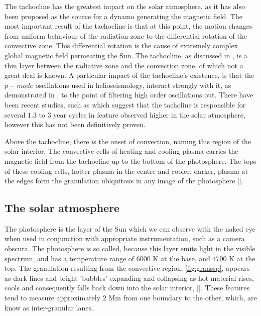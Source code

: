 The tachocline has the greatest impact on the solar atmosphere, as it has also been proposed as the source for a dynamo generating the magnetic field.
The most important result of the tachocline is that at this point, the motion changes from uniform behaviour of the radiation zone to the differential rotation of the convective zone.
This differential rotation is the cause of extremely complex global magnetic field permeating the Sun.
The tachocline, as discussed in \cite{Brun2001}, is a thin layer between the radiative zone and the convection zone, of which not a great deal is known.
A particular impact of the tachocline's existence, is that the $p-mode$ oscillations used in helioseismology, interact strongly with it, as demonstrated in \cite{Chaplin2014}, to the point of filtering high order oscillations out.
There have been recent studies, such as \cite{Obridko2007} which suggest that the tacholine is responsible for several $1.3$ to $3$ year cycles in feature observed higher in the solar atmosphere, however this has not been definitively proven.

Above the tachocline, there is the onset of convection, naming this region of the solar interior.
The convective cells of heating and cooling plasma carries the magnetic field from the tachocline up to the bottom of the photosphere.
The tops of these cooling cells, hotter plasma in the centre and cooler, darker, plasma at the edges form the granulation ubiquitous in any image of the photosphere [\cite{Nordlund2009}].


\subsection{The solar atmosphere}
The photosphere is the layer of the Sun which we can observe with the naked eye when used in conjunction with appropriate instrumentation, such as a camera obscura.
The photosphere is so called, because this layer emits light in the visible spectrum, and has a temperature range of $6000$ K at the base, and $4700$ K at the top. 
The granulation resulting from the convective region, \cref{fig:granssp}, appears as dark lines and bright 'bubbles' expanding and collapsing as hot material rises, cools and consequently falls back down into the solar interior, [\cite{Nordlund2009}].
These features tend to measure approximately $2$ Mm from one boundary to the other, which, are know as inter-granular lanes.

